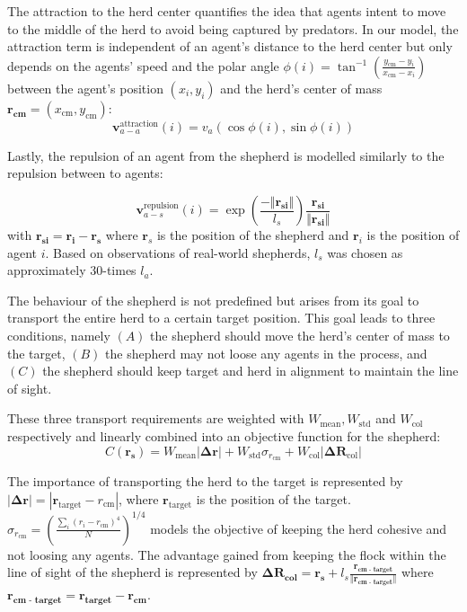 The attraction to the herd center quantifies the idea that agents intent to move to the middle of the herd to avoid being captured by predators. In our model, the attraction term is independent of an agent's distance to the herd center but only depends on the agents' speed and the polar angle $\phi(i) = \tan^{-1}\left(\frac{y_\text{cm} - y_i}{x_\text{cm} - x_i}\right)$ between the agent's position $(x_i, y_i)$ and the herd's center of mass $\boldsymbol{r_\text{cm}} = (x_\text{cm}, y_\text{cm})$:
$$\boldsymbol{v}^\text{attraction}_{a-a}(i) = v_a \left(\cos \phi(i), \sin \phi(i)\right)$$

Lastly, the repulsion of an agent from the shepherd is modelled similarly to the repulsion between to agents:

$$\boldsymbol{v}^\text{repulsion}_{a-s}(i) = \exp\left(\frac{-\Vert\boldsymbol{r_{si}}\Vert}{l_s}\right)\frac{\boldsymbol{r_{si}}}{\Vert\boldsymbol{r_{si}}\Vert}$$
with $\boldsymbol{r_{si}}=\boldsymbol{r_i} - \boldsymbol{r_s}$ where $\boldsymbol{r}_s$ is the position of the shepherd and $\boldsymbol{r}_i$ is the position of agent $i$. Based on observations of real-world shepherds, $l_s$ was chosen as approximately 30-times $l_a$.

The behaviour of the shepherd is not predefined but arises from its goal to transport the entire herd to a certain target position. This goal leads to three conditions, namely $(A)$ the shepherd should move the herd's center of mass to the target, $(B)$ the shepherd may not loose any agents in the process, and $(C)$ the shepherd should keep target and herd in alignment to maintain the line of sight.

These three transport requirements are weighted with $W_\text{mean}, W_\text{std}$ and $W_\text{col}$ respectively and linearly combined into an objective function for the shepherd:
\begin{equation}
\label{eq:objective_function}
    C(\boldsymbol{r_s}) = W_\text{mean}|\boldsymbol{\Delta r}| + W_\text{std} \sigma_{r_\text{cm}} + W_\text{col} |\boldsymbol{\Delta R}_\text{col}|
\end{equation}

The importance of transporting the herd to the target is represented by $|\boldsymbol{\Delta r}| = |\boldsymbol{r}_\text{target} - r_\text{cm}|$, where $\boldsymbol{r}_\text{target}$ is the position of the target. $\sigma_{r_\text{cm}} = \left(\frac{\sum_i(r_i - r_\text{cm})^4}{N}\right)^{1/4}$ models the objective of keeping the herd cohesive and not loosing any agents. The advantage gained from keeping the flock within the line of sight of the shepherd is represented by $\boldsymbol{\Delta R_\text{col}} = \boldsymbol{r_s} + l_s \frac{\boldsymbol{r_\text{cm - target}}}{\Vert \boldsymbol{r_\text{cm - target}} \Vert}$ where $\boldsymbol{r_\text{cm - target}} = \boldsymbol{r_\text{target}} - \boldsymbol{r_\text{cm}}$.

